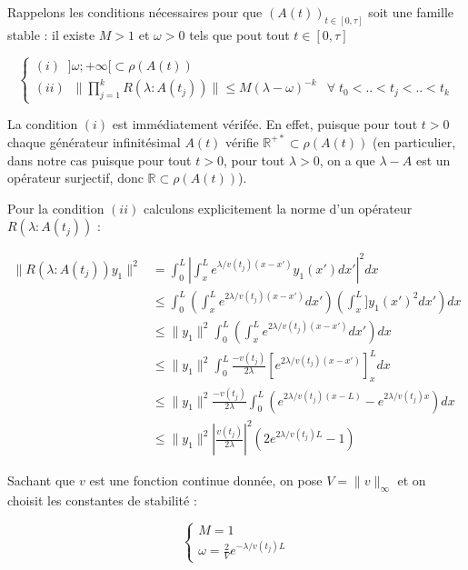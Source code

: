 \documentclass[a4paper]{article}
\begin{document}
\begin{preuve}
	Rappelons les conditions nécessaires pour que  $(A(t))_{t \in [0,\tau]}$  
	soit une famille stable :
	il existe $M>1$ et $\omega>0$ tels que pout tout $t \in [0,\tau]$ 
	
	\[ 
	\begin{cases}
		(i) \; \; ] \omega; +\infty[ \subset \rho(A(t)) & \\
		(ii) \; \; \|  \displaystyle \prod_{j=1}^{k} R(\lambda:A(t_j))\| \leq M(\lambda-\omega)^{-k} & \forall \; t_0<..<t_j<..<t_k
	\end{cases}
	\]
	
	La condition $(i)$ est immédiatement vérifée. En effet, puisque pour tout $t>0$
	chaque générateur infinitésimal $A(t)$ vérifie $ \mathbb{R}^{+*} \subset \rho(A(t)) $ 
	(en particulier, dans notre cas puisque pour tout $t>0$, pour tout $\lambda >0$, 
	on a que $\lambda - A$ est un opérateur surjectif, donc $\mathbb{R} \subset \rho(A(t)) $).
	
	Pour la condition $(ii)$ calculons explicitement la norme d'un opérateur $R(\lambda:A(t_j))$ :
	
	\[
	\begin{split}
		\displaystyle \|R(\lambda:A(t_j))y_1 \|^2 & = \int_0^L |\int_x^L e^{\lambda/v(t_j)(x-x')}y_1(x')dx'|^2dx \\
		                                          & \leq \int_0^L (\int_x^L e^{2\lambda/v(t_j)(x-x')}dx') (\int_x^L] y_1(x')^2 dx') dx \\
												  & \leq \|y_1\|^2 \int_0^L (\int_x^L e^{2\lambda/v(t_j)(x-x')}dx')dx \\
												  & \leq \|y_1\|^2 \int_0^L \displaystyle \frac{-v(t_j)}{2\lambda}[e^{2\lambda/v(t_j)(x-x')}]_x^L dx \\
												  & \leq \|y_1\|^2 \displaystyle \frac{-v(t_j)}{2\lambda} \int_0^L (e^{2\lambda/v(t_j)(x-L)}-e^{2\lambda/v(t_j)x}) dx \\
												  & \leq \|y_1\|^2 \displaystyle |\frac{v(t_j)}{2\lambda}|^2(2e^{2\lambda/v(t_j)L}-1)
	\end{split}
	\]
	
	
	
	Sachant que $v$ est une fonction continue donnée, on pose $V = \|v\|_{\infty}$ 
	et on choisit les constantes de stabilité :
	
	\begin{equation}
		\begin{cases}
			M = 1 \\
			\omega = \frac{2}{V}e^{-\lambda/v(t_j)L}
		\end{cases}
	\end{equation}
	

\end{preuve}
\end{document}
